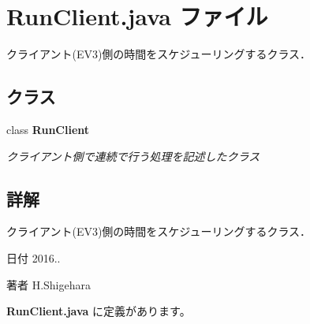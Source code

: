 \section{Run\-Client.\-java ファイル}
\label{_run_client_8java}


クライアント(\-E\-V3)側の時間をスケジューリングするクラス．  


\subsection*{クラス}
\begin{DoxyCompactItemize}
\item 
class {\bf Run\-Client}
\begin{DoxyCompactList}\small\item\em クライアント側で連続で行う処理を記述したクラス \end{DoxyCompactList}\end{DoxyCompactItemize}


\subsection{詳解}
クライアント(\-E\-V3)側の時間をスケジューリングするクラス． \begin{DoxyDate}{日付}
2016.. 
\end{DoxyDate}
\begin{DoxyAuthor}{著者}
H.\-Shigehara 
\end{DoxyAuthor}


 {\bf Run\-Client.\-java} に定義があります。

